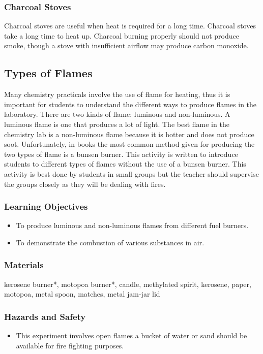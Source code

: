\subsubsection{Charcoal Stoves}

Charcoal stoves are useful when heat is required for a long time. Charcoal stoves take a long time to heat up. Charcoal burning properly should not produce smoke, though a stove with insufficient airflow may produce carbon monoxide.

\subsection{Types of Flames}
Many chemistry practicals involve the use of flame for heating, thus it is important for students to understand the different ways to produce flames in the laboratory. There are two kinds of flame: luminous and non-luminous. A luminous flame is one that produces a lot of light. The best flame in the chemistry lab is a non-luminous flame because it is hotter and does not produce soot. Unfortunately, in books the most common method given for producing the two types of flame is a bunsen burner. This activity is written to introduce students to different types of flames without the use of a bunsen burner. This activity is best done by students in small groups but the teacher should supervise the groups closely as they will be dealing with fires.
\subsubsection*{Learning Objectives}
\begin{itemize}
\item{To produce luminous and non-luminous flames from different fuel burners.}
\item{To demonstrate the combustion of various substances in air.}
\end{itemize}

\subsubsection*{Materials}
kerosene burner*, motopoa burner*, candle,  methylated spirit, kerosene, paper, motopoa, metal spoon, matches, metal jam-jar lid

\subsubsection*{Hazards and Safety}
\begin{itemize}
\item{This experiment involves open flames a bucket of water or sand should be available for fire fighting purposes.}
\end{itemize}

